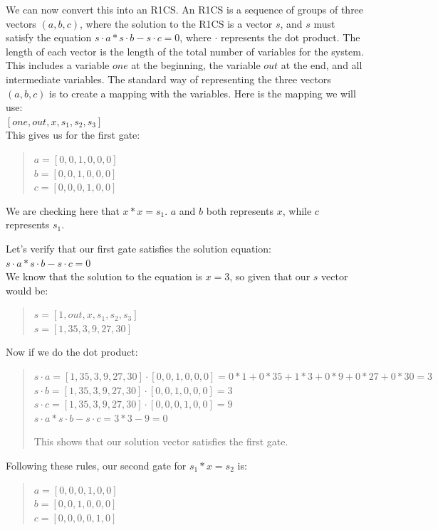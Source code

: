We can now convert this into an R1CS.
An R1CS is a sequence of groups of three vectors $(a, b, c)$, where the solution to the R1CS is a vector $s$, and $s$ must satisfy the equation $s \cdot a * s \cdot b - s \cdot c = 0$, where $\cdot$ represents the dot product.
The length of each vector is the length of the total number of variables for the system. This includes a variable $one$ at the beginning, the variable $out$ at the end, and all intermediate variables.
The standard way of representing the three vectors $(a, b, c)$ is to create a mapping with the variables.
Here is the mapping we will use:
\\ 
$[one,out,x,s_1,s_2,s_3]$
\\
This gives us for the first gate:
\begin{quote}
   $a = [0,0,1,0,0,0]$
   \\
   $b = [0,0,1,0,0,0]$
   \\
   $c = [0,0,0,1,0,0]$
\end{quote}
We are checking here that $x*x=s_1$.
$a$ and $b$ both represents $x$, while $c$ represents $s_1$.

   Let's verify that our first gate satisfies the solution equation:
   \\
   $s \cdot a * s \cdot b - s \cdot c = 0$
   \\
   We know that the solution to the equation is $ x = 3 $, so given that our $s$ vector
   would be: 
   \begin{quote}
   $s=[1,out,x,s_1,s_2,s_3]$
   \\
   $s=[1,35,3,9,27,30]$
\end{quote}

Now if we do the dot product:
\begin{quote}
   $s \cdot a =  [1,35,3,9,27,30] \cdot [0,0,1,0,0,0] = 0*1+0*35+1*3+0*9+0*27+0*30= 3$ 
   $s \cdot b = [1,35,3,9,27,30] \cdot [0,0,1,0,0,0] = 3$ 
   $s \cdot c = [1,35,3,9,27,30] \cdot [0,0,0,1,0,0] = 9$ 
$s \cdot a * s \cdot b - s \cdot c =  3 * 3 - 9 = 0$

This shows that our solution vector satisfies the first gate.
\end{quote}

Following these rules, our second gate for $s_1*x=s_2$ is:
\begin{quote}
   $a = [0,0,0,1,0,0]$
   \\
   $b = [0,0,1,0,0,0]$
   \\
   $c = [0,0,0,0,1,0]$
\end{quote}

